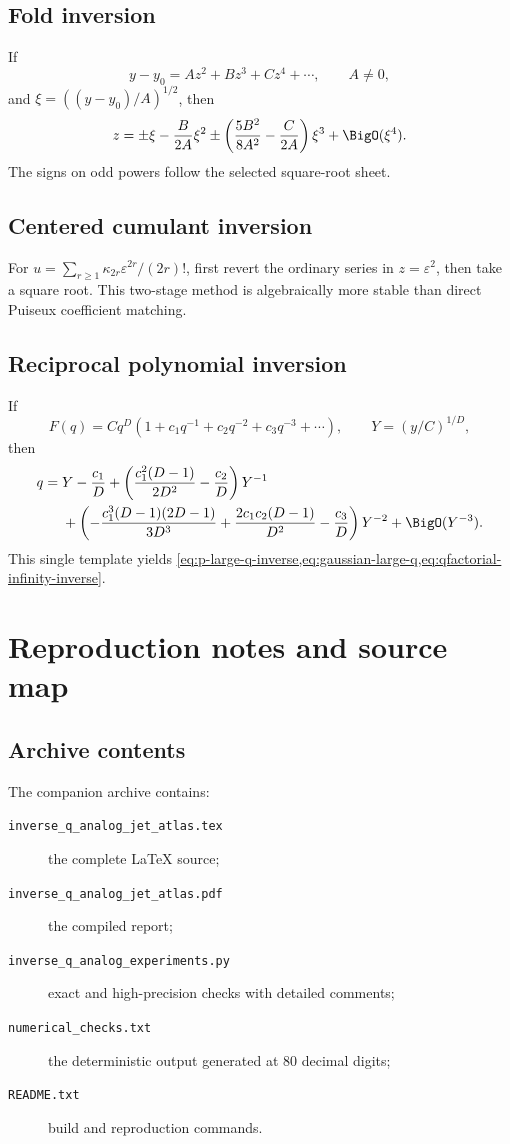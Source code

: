 \documentclass[11pt,letterpaper,oneside,openany]{book}
\theoremstyle{definition}
\theoremstyle{remark}
\begin{document}
\section{Fold inversion}
If
\[
 y-y_0=A z^2+Bz^3+Cz^4+\cdots,
 \qquad A\ne0,
\]
and \(\xi=((y-y_0)/A)^{1/2}\), then
\[
 z=\pm\xi-\frac{B}{2A}\xi^2
 \pm\left(\frac{5B^2}{8A^2}-\frac{C}{2A}\right)\xi^3
 +\BigO(\xi^4).
\]
The signs on odd powers follow the selected square-root sheet.

\section{Centered cumulant inversion}
For \(u=\sum_{r\ge1}\kappa_{2r}\varepsilon^{2r}/(2r)!\), first revert the
ordinary series in \(z=\varepsilon^2\), then take a square root.  This two-stage
method is algebraically more stable than direct Puiseux coefficient matching.

\section{Reciprocal polynomial inversion}
If
\[
 F(q)=Cq^D(1+c_1q^{-1}+c_2q^{-2}+c_3q^{-3}+\cdots),
 \qquad Y=(y/C)^{1/D},
\]
then
\begin{align*}
 q={}&Y-\frac{c_1}{D}
 +\left(\frac{c_1^2(D-1)}{2D^2}-\frac{c_2}{D}\right)Y^{-1} \\
 &+\left(
 -\frac{c_1^3(D-1)(2D-1)}{3D^3}
 +\frac{2c_1c_2(D-1)}{D^2}
 -\frac{c_3}{D}
 \right)Y^{-2}+\BigO(Y^{-3}).
\end{align*}
This single template yields
\cref{eq:p-large-q-inverse,eq:gaussian-large-q,eq:qfactorial-infinity-inverse}.

\chapter{Reproduction notes and source map}

\section{Archive contents}
The companion archive contains:
\begin{description}
\item[\texttt{inverse\_q\_analog\_jet\_atlas.tex}] the complete LaTeX source;
\item[\texttt{inverse\_q\_analog\_jet\_atlas.pdf}] the compiled report;
\item[\texttt{inverse\_q\_analog\_experiments.py}] exact and high-precision
checks with detailed comments;
\item[\texttt{numerical\_checks.txt}] the deterministic output generated at
80 decimal digits;
\item[\texttt{README.txt}] build and reproduction commands.
\end{description}
\end{document}
